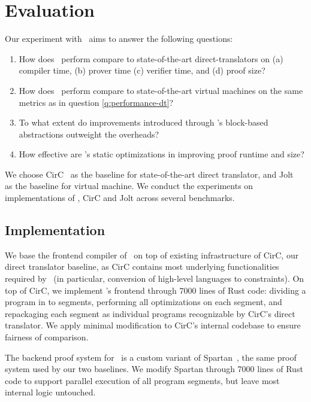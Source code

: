 \section{Evaluation}

Our experiment with \CoBBl~aims to answer the following questions:
\begin{enumerate}
  \item How does \CoBBl~perform compare to state-of-the-art direct-translators on (a) compiler time, (b) prover time (c) verifier time, and (d) proof size? \label{q:performance-dt}
  \item How does \CoBBl~perform compare to state-of-the-art virtual machines on the same metrics as in question \ref{q:performance-dt}? \label{q:performance-vm}
  \item To what extent do improvements introduced through \CoBBl's block-based abstractions outweight the overheads? \label{q:tradeoff}
  \item How effective are \CoBBl's static optimizations in improving proof runtime and size? \label{q:optimization}
\end{enumerate}

We choose CirC~\cite{ozdemir20circ} as the baseline for state-of-the-art direct translator, and Jolt~\cite{arun23jolt} as the baseline for virtual machine.  We conduct the experiments on implementations of \CoBBl, CirC and Jolt across several benchmarks.

\subsection{Implementation}
 We base the frontend compiler of \CoBBl~on top of existing infrastructure of CirC, our direct translator baseline, as CirC contains most underlying functionalities required by \CoBBl~(in particular, conversion of high-level languages to constraints). On top of CirC, we implement \CoBBl's frontend through 7000 lines of Rust code: dividing a program in to segments, performing all optimizations on each segment, and repackaging each segment as individual programs recognizable by CirC's direct translator. We apply minimal modification to CirC's internal codebase to ensure fairness of comparison.

The backend proof system for \CoBBl~is a custom variant of Spartan~\cite{setty19spartan}, the same proof system used by our two baselines. We modify Spartan through 7000 lines of Rust code to support parallel execution of all program segments, but leave most internal logic untouched.

